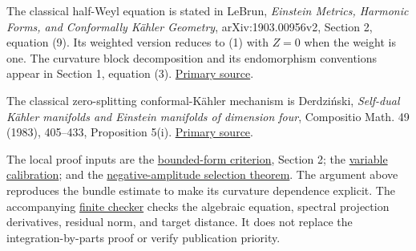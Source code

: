 \documentclass[
  11pt,
]{article}
\begin{document}
The classical half-Weyl equation is stated in LeBrun, \emph{Einstein
Metrics, Harmonic Forms, and Conformally Kähler Geometry},
arXiv:1903.00956v2, Section 2, equation (9). Its weighted version
reduces to (1) with \(Z=0\) when the weight is one. The curvature block
decomposition and its endomorphism conventions appear in Section 1,
equation (3). \href{https://arxiv.org/html/1903.00956}{Primary source}.

The classical zero-splitting conformal-Kähler mechanism is Derdziński,
\emph{Self-dual Kähler manifolds and Einstein manifolds of dimension
four}, Compositio Math. 49 (1983), 405--433, Proposition 5(i).
\href{https://www.numdam.org/article/CM_1983__49_3_405_0.pdf}{Primary
source}.

The local proof inputs are the \href{round21_analytic.md}{bounded-form
criterion}, Section 2; the \href{line1_variable_calibration.md}{variable
calibration}; and the
\href{line1_variable_negative_selection.md}{negative-amplitude selection
theorem}. The argument above reproduces the bundle estimate to make its
curvature dependence explicit. The accompanying
\href{check_line1_half_weyl_regularity.py}{finite checker} checks the
algebraic equation, spectral projection derivatives, residual norm, and
target distance. It does not replace the integration-by-parts proof or
verify publication priority.
\end{document}
